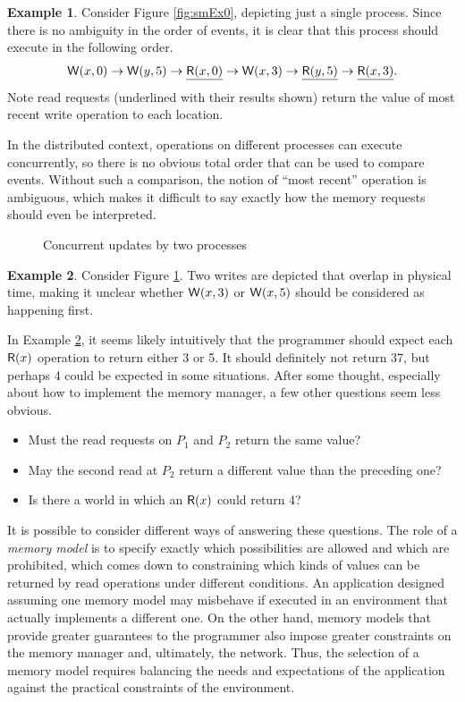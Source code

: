 \documentclass[]             %
{NASA}                       %
\theoremstyle{definition}
\newtheorem{example}{Example}[section]
\begin{document}
\begin{example}
  \label{exmpl:updatesoneprocess}
  Consider Figure \ref{fig:smEx0}, depicting just a single
  process. Since there is no ambiguity in the order of events, it is
  clear that this process should execute in the following order.
  \[ \mathsf{W}\!\left(x, 0\right) \to \mathsf{W}\!\left(y, 5\right) \to \underline{\mathsf{R}\!\left(x, 0\right)} \to \mathsf{W}\!\left(x, 3\right) \to \underline{\mathsf{R}\!\left(y, 5\right)} \to \underline{\mathsf{R}\!\left(x, 3\right)}. \]
  Note read requests (underlined with their results shown) return the value of most recent write operation to each location.
\end{example}

In the distributed context, operations on different processes can
execute concurrently, so there is no obvious total order that can be
used to compare events. Without such a comparison, the notion of
``most recent'' operation is ambiguous, which makes it difficult to
say exactly how the memory requests should even be interpreted.

\begin{figure}
  
  \caption{Concurrent updates by two processes}
  \label{fig:smEx2}
\end{figure}

\begin{example}
  \label{exmpl:concurrentupdates}
  Consider Figure \ref{fig:smEx2}. Two writes are depicted that overlap
  in physical time, making it unclear whether $\mathsf{W}\!\left(x, 3\right)$ or $\mathsf{W}\!\left(x, 5\right)$
  should be considered as happening first.
\end{example}

In Example \ref{exmpl:concurrentupdates}, it seems likely intuitively
that the programmer should expect each $\mathsf{R}\!\left(x\right)$ operation to return
either 3 or 5. It should definitely not return 37, but perhaps 4 could
be expected in some situations. After some thought, especially about
how to implement the memory manager, a few other questions seem less
obvious.
\begin{itemize}
\item Must the read requests on $P_1$ and $P_2$ return the same value?
\item May the second read at $P_2$ return a different value
  than the preceding one?
\item Is there a world in which an $\mathsf{R}\!\left(x\right)$ could return 4?
\end{itemize}

It is possible to consider different ways of answering these
questions. The role of a \emph{memory model} is to specify exactly
which possibilities are allowed and which are prohibited, which comes
down to constraining which kinds of values can be returned by read
operations under different conditions. An application designed
assuming one memory model may misbehave if executed in an environment
that actually implements a different one. On the other hand, memory
models that provide greater guarantees to the programmer also impose
greater constraints on the memory manager and, ultimately, the
network. Thus, the selection of a memory model requires balancing the
needs and expectations of the application against the practical
constraints of the environment.
\end{document}
